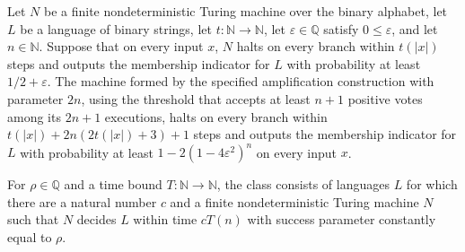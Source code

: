 \begin{theorem}
\label{Turing.FinNDTM.BPDecidesInTimeWith.amp}
\leanok
{}
Let $N$ be a finite nondeterministic Turing machine over the binary alphabet, let $L$ be
a language of binary strings, let $t\colon\mathbb{N}\to\mathbb{N}$, let
$\varepsilon\in\mathbb{Q}$ satisfy $0\le\varepsilon$, and let $n\in\mathbb{N}$. Suppose
that on every input $x$, $N$ halts on every branch within $t(|x|)$ steps and outputs the
membership indicator for $L$ with probability at least $1/2+\varepsilon$. The machine
formed by the specified amplification construction with parameter $2n$, using the
threshold that accepts at least $n+1$ positive votes among its $2n+1$ executions, halts
on every branch within $t(|x|)+2n(2t(|x|)+3)+1$ steps and outputs the membership
indicator for $L$ with probability at least $1-2(1-4\varepsilon^2)^n$ on every input
$x$.
\end{theorem}

\begin{definition}
\label{Randomized.BPTIMEWith}
\leanok
{}
For $\rho\in\mathbb{Q}$ and a time bound $T:\mathbb{N}\to\mathbb{N}$, the class consists
of languages $L$ for which there are a natural number $c$ and a finite nondeterministic
Turing machine $N$ such that $N$ decides $L$ within time $cT(n)$ with success parameter
constantly equal to $\rho$.
\end{definition}

